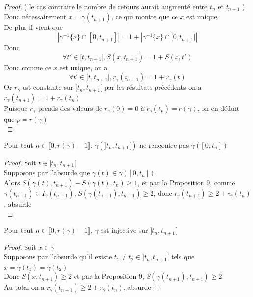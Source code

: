 \documentclass{article}
\begin{document}
\begin{flushleft}
\begin{proof}
( le cas contraire le nombre de retours aurait augmenté entre $t_n$ et $t_{n+1}$ )\\
Donc nécessairement $x = \gamma(t_{n+1})$, ce qui montre que ce $x$ est unique\\
De plus il vient que
\[ | \gamma^{-1} \{ x \} \cap [0, t_{n+1}] | = 1 + | \gamma^{-1} \{ x \} \cap [0, t_{n+1}[ |\]
Donc
\[ \forall t' \in [t, t_{n+1}[, S(x, t_{n+1}) = 1 + S(x, t')\]
Donc comme ce $x$ est unique, on a
\[ \forall t' \in [t, t_{n+1}[, r_{\gamma}(t_{n+1}) = 1 + r_{\gamma}(t)\]
Or $r_{\gamma}$ est constante sur $[t_n, t_{n+1}[$ par les résultats précédents on a 
$r_{\gamma}(t_{n+1}) = 1 + r_{\gamma}(t_n)$\\
Puisque $r_{\gamma}$ prends des valeurs de $r_{\gamma}(0) = 0$ à $r_{\gamma}(t_p) = r(\gamma)$,
on en déduit que $p = r(\gamma)$\\

\end{proof}

\begin{tcolorbox}[colback=purple!20!white, colframe=purple!60!white, title = Corollaire 1]
    Pour tout $n \in \llbracket 0, r(\gamma)-1 \rrbracket$, $\gamma(]t_n, t_{n+1}[)$ ne rencontre pas
    $\gamma([0, t_n])$
\end{tcolorbox}

\begin{proof}
    Soit $t \in ]t_n, t_{n+1}[$\\
    Supposons par l'absurde que $\gamma(t) \in \gamma([0, t_n])$\\
    Alors $S(\gamma(t), t_{n+1}) - S(\gamma(t), t_n) \geq 1$, et par la Proposition 9, comme $\gamma(t_{n+1}) \in I_{\gamma}(t_{n+1})$,
    $S(\gamma(t_{n+1}), t_{n+1}) \geq 2$, donc
    $r_{\gamma}(t_{n+1}) \geq 2 + r_{\gamma}(t_n)$, absurde\\
\end{proof}

\begin{tcolorbox}[colback=purple!20!white, colframe=purple!60!white, title = Corollaire 2]
    Pour tout $n \in \llbracket 0, r(\gamma)-1 \rrbracket$, $\gamma$ est injective sur $]t_n, t_{n+1}[$
\end{tcolorbox}

\begin{proof}
    Soit $x \in \gamma$\\
    Supposons par l'absurde qu'il existe $t_1 \neq t_2 \in ]t_n, t_{n+1}[$ tels que $x = \gamma(t_1) = \gamma(t_2)$\\
    Donc $S(x, t_{n+1}) \geq 2$ et par la Proposition 9, $S(\gamma(t_{n+1}), t_{n+1}) \geq 2$\\
    Au total on a $r_{\gamma}(t_{n+1}) \geq 2 + r_{\gamma}(t_n)$, absurde
\end{proof}


\end{flushleft}
\end{document}
